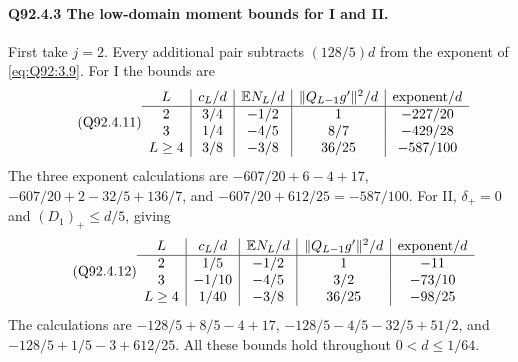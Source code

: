 \paragraph{Q92.4.3 The low-domain moment bounds for I and II.}
First take \(j=\allowbreak 2\). Every additional pair subtracts \((128/5)d\)
from the exponent of \eqref{eq:Q92:3.9}. For I the bounds are
\begin{equation}\tag{Q92.4.11}\label{eq:Q92:4.11}
\begin{array}{c|c|c|c|c}
L&c_L/d&\mathbb E N_L/d&\|Q_{L-1}g'\|^2/d&\text{exponent}/d\\\hline
2&3/4&-1/2&1&-227/20\\
3&1/4&-4/5&8/7&-429/28\\
L\ge4&3/8&-3/8&36/25&-587/100
\end{array}
\end{equation}
The three exponent calculations are
\(-607/20+6-4+17\), \(-607/20+2-32/5+136/7\), and
\(-607/20+612/25=\allowbreak -587/100\).
For II, \(\delta_+=\allowbreak 0\) and \((D_1)_+\le\allowbreak  d/5\), giving
\begin{equation}\tag{Q92.4.12}\label{eq:Q92:4.12}
\begin{array}{c|c|c|c|c}
L&c_L/d&\mathbb E N_L/d&\|Q_{L-1}g'\|^2/d&\text{exponent}/d\\\hline
2&1/5&-1/2&1&-11\\
3&-1/10&-4/5&3/2&-73/10\\
L\ge4&1/40&-3/8&36/25&-98/25
\end{array}
\end{equation}
The calculations are \(-128/5+8/5-4+17\),
\(-128/5-4/5-32/5+51/2\), and \(-128/5+1/5-3+612/25\).
All these bounds hold throughout \(0<\allowbreak d\le\allowbreak 1/64\).

